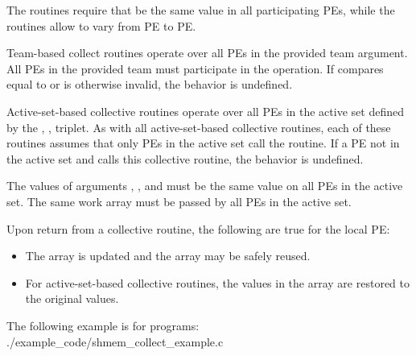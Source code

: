 \begin{apidefinition}
{    The  routines require that  be the same value in all
    participating \acp{PE}, while the  routines allow  to
    vary from \ac{PE} to \ac{PE}.

    Team-based collect routines operate over all \acp{PE} in the provided team argument. All
    \acp{PE} in the provided team must participate in the operation.
    If  compares equal to  or is
    otherwise invalid, the behavior is undefined.

    Active-set-based collective routines operate over all \acp{PE} in the active set
    defined by the , ,  triplet.
    As with all active-set-based collective routines,
    each of these routines assumes that
    only \acp{PE} in the active set call the routine. If a \ac{PE} not in the
    active set and calls this collective routine, the behavior is undefined.
    
    The values of arguments , , and 
    must be the same value on all \acp{PE} in the active set. The same
     work array must be passed by all \acp{PE} in the active set.
    
    Upon return from a collective routine, the following are true for the local
    \ac{PE}:
    \begin{itemize}
    \item The \dest{} array is updated and the \source{} array may be safely reused. 
    \item For active-set-based collective routines, the values in the  array are
    restored to the original values.
    \end{itemize}
}



\begin{apiexamples}

\apicexample
    {The following  example is for \CorCpp{} programs:}
    {./example_code/shmem_collect_example.c}
    {}

\end{apiexamples}

\end{apidefinition}
